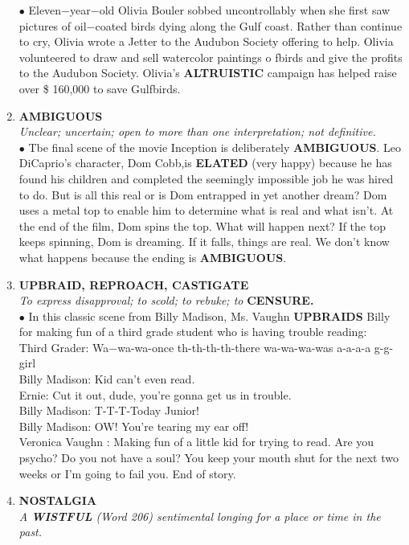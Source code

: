\documentclass{book}
\begin{document}
\begin{enumerate}
$ \bullet $ Eleven$-$year$-$old Olivia Bouler sobbed uncontrollably
when she first saw pictures of oil$-$coated birds dying
along the Gulf coast. Rather than continue to cry,
Olivia wrote a Jetter to the Audubon Society offering
to help. Olivia volunteered to draw and sell watercolor
paintings o fbirds and give the profits to the Audubon
Society. Olivia's \textbf{ALTRUISTIC} campaign has helped
raise over \$ 160,000 to save Gulfbirds.

\item \textbf{AMBIGUOUS}\\
\textit{Unclear; uncertain; open to more than one interpretation; not definitive.}\\

$ \bullet $ Tbe final scene of the movie Inception is deliberately \textbf{AMBIGUOUS}. Leo DiCaprio's character, Dom Cobb,is \textbf{ELATED} (very happy) because he has found his
children and completed the seemingly impossible job
he was hired to do. But is all this real or is Dom
entrapped in yet another dream? Dom uses a metal
top to enable him to determine what is real and what
isn't. At the end of the film, Dom spins the top. What
will happen next? If the top keeps spinning, Dom is
dreaming. If it falls, things are real. We don't know
what happens because the ending is \textbf{AMBIGUOUS}.

\item  \textbf{UPBRAID, REPROACH, CASTIGATE}\\ \textit{To express disapproval; to scold; to rebuke; to }\textbf{CENSURE.}\\

$\bullet$ In this classic scene from Billy Madison, Ms. Vaughn \textbf{UPBRAIDS} Billy for making fun of a third grade student who is having trouble reading: \\Third Grader: Wa$-$wa-wa-once th-th-th-th-there wa-wa-wa-was a-a-a-a g-g-girl \\Billy Madison: Kid can't even read. \\Ernie: Cut it out, dude, you're gonna get us in trouble. \\Billy Madison: T-T-T-Today Junior! \\Billy Madison: OW! You're tearing my ear off! \\Veronica Vaughn : Making fun of a little kid for trying to read. Are you psycho? Do you not have a soul? You keep your mouth shut for the next two weeks or I'm going to fail you. End of story.

\item  \textbf{NOSTALGIA}\\
\textit{A \textbf{WISTFUL} (Word 206) sentimental longing for a place or time in the past.}\\


\end{enumerate}
\end{document}
